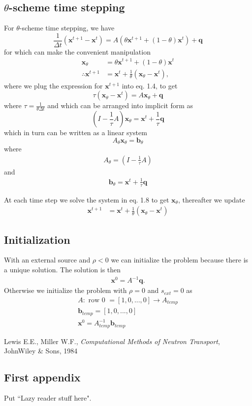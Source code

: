 \documentclass[11pt,letterpaper,notitlepage]{article}
\newcommand{\beqn}{\begin{equation}
		\begin{aligned}}
\newcommand{\eeqn}{\end{aligned}
\end{equation}}
\numberwithin{equation}{section}
\begin{document}
\subsection{$\theta$-scheme time stepping}
For $\theta$-scheme time stepping, we have
\begin{equation}
	\frac{1}{\Delta t} (\mathbf{x}^{t+1} - \mathbf{x}^t) = A(\theta \mathbf{x}^{t+1} + (1-\theta) \mathbf{x}^{t}) + \mathbf{q}
\end{equation}
for which can make the convenient manipulation
\begin{equation}
\begin{aligned}
	\mathbf{x}_{\theta} &= \theta \mathbf{x}^{t+1} + (1-\theta) \mathbf{x}^{t} \\
	\therefore \mathbf{x}^{t+1} &= \mathbf{x}^t + \frac{1}{\theta} (\mathbf{x}_\theta - \mathbf{x}^t),
\end{aligned}
\end{equation}
where we plug the expression for $\mathbf{x}^{t+1}$ into eq. 1.4, to get
\begin{equation}
	\tau (\mathbf{x}_\theta - \mathbf{x}^t) = A\mathbf{x}_\theta  + \mathbf{q}
\end{equation}
where $\tau = \frac{1}{\theta \Delta t}$ and which can be arranged into implicit form as
\begin{equation}
	(I - \frac{1}{\tau}A)\mathbf{x}_{\theta} = \mathbf{x}^t + \frac{1}{\tau} \mathbf{q}
\end{equation}
which in turn can be written as a linear system
\begin{equation}
	A_{\theta} \mathbf{x}_{\theta} = \mathbf{b}_{\theta}
\end{equation}
where
\beqn
A_\theta = (I - \frac{1}{\tau}A)
\eeqn 
and
\beqn 
\mathbf{b}_{\theta} = \mathbf{x}^t + \frac{1}{\tau} \mathbf{q}
\eeqn 

At each time step we solve the system in eq. 1.8 to get $\mathbf{x}_\theta$, thereafter we update 
\beqn 
\mathbf{x}^{t+1} &= \mathbf{x}^t + \frac{1}{\theta} (\mathbf{x}_\theta - \mathbf{x}^t)
\eeqn 

\subsection{Initialization}
With an external source and $\rho < 0$ we can initialize the problem because there is a unique solution. The solution is then
\beqn 
\mathbf{x}^0  = A^{-1} \mathbf{q}.
\eeqn 
Otherwise we initialize the problem with $\rho = 0$ and $s_{ext} = 0$ as
\beqn 
A: \text{ row 0 } = [1, 0, ..., 0] \to A_{temp} \\
\mathbf{b}_{temp} = [1, 0, ..., 0]\\
\mathbf{x}^0 = A_{temp}^{-1} \mathbf{b}_{temp}
\eeqn 

\newpage
\begin{thebibliography}{1}
	
	 Lewis E.E., Miller W.F., {\em Computational Methods of Neutron Transport}, JohnWiley \& Sons, 1984
	   
\end{thebibliography}

\newpage
\begin{appendices}
\section{First appendix}
Put ``Lazy reader stuff here".
\end{appendices}
\end{document}
